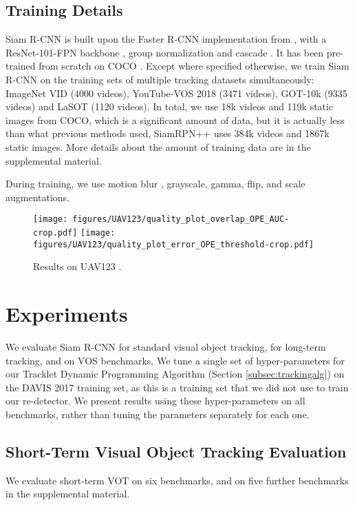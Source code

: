 \documentclass[10pt,twocolumn,letterpaper]{article}
\begin{document}
\subsection{Training Details}
Siam R-CNN is built upon the Faster R-CNN \cite{Ren15NIPS} implementation from \cite{Wu16tensorpack}, with a ResNet-101-FPN backbone \cite{resnet, Lin17CVPR}, group normalization \cite{Wu18ECCV} and cascade \cite{Cai18CVPR}. It has been pre-trained from scratch \cite{He19ICCV} on COCO \cite{coco}.
Except where specified otherwise, we train Siam R-CNN on the training sets of multiple tracking datasets simultaneously:
 ImageNet VID \cite{imagenet} (4000 videos), YouTube-VOS 2018  \cite{Xu18ECCV} (3471 videos), GOT-10k \cite{Huang18Arxiv} (9335 videos) and LaSOT \cite{Fan19CVPRLASOT} (1120 videos). In total, we use 18k videos and 119k static images from COCO, which is a significant amount of data, but it is actually less than what previous methods used, \eg SiamRPN++ uses 384k videos and 1867k static images.
More details about the amount of training data are in the supplemental material.

During training, we use motion blur \cite{Zhu18ECCV}, grayscale, gamma, flip, and scale augmentations.



\begin{figure}[t]
\centering
\texttt{[image: figures/UAV123/quality\_plot\_overlap\_OPE\_AUC-crop.pdf]}
\texttt{[image: figures/UAV123/quality\_plot\_error\_OPE\_threshold-crop.pdf]}
\caption{Results on UAV123 \cite{Mueller16ECCV}.}
\label{fig:uav123-res}
\end{figure}

\section{Experiments}

We evaluate Siam R-CNN for standard visual object tracking, for long-term tracking, and on VOS benchmarks.
We tune a single set of hyper-parameters for our Tracklet Dynamic Programming Algorithm (\cf Section \ref{subsec:trackingalg}) on the DAVIS 2017 training set, as this is a training set that we did not use to train our re-detector. We present results using these hyper-parameters on all benchmarks, rather than tuning the parameters separately for each one. 

\subsection{Short-Term Visual Object Tracking Evaluation}
We evaluate short-term VOT on six benchmarks, and on five further benchmarks in the supplemental material.
\end{document}
